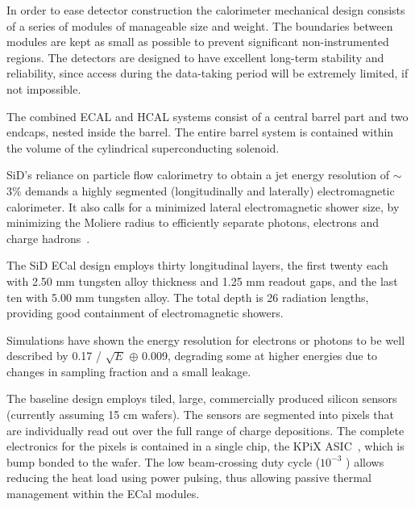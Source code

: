 In order to ease detector construction the calorimeter mechanical design consists of a series of modules of
manageable size and weight. The boundaries between
modules are kept as small as possible to prevent significant non-instrumented
regions. The detectors are designed to have excellent long-term stability and reliability,
since access during the data-taking period will be extremely limited, if not
impossible.

The combined ECAL and HCAL systems consist of a
central barrel part and two endcaps, nested inside the barrel. The entire barrel system is contained
within the volume of the cylindrical superconducting solenoid. 


SiD's reliance on particle flow calorimetry to obtain a jet energy resolution of  $\sim$3\% demands a highly segmented (longitudinally and laterally) electromagnetic calorimeter. It also calls for a minimized lateral electromagnetic shower size, by minimizing the Moliere radius to efficiently separate photons, electrons and charge hadrons~\cite{calor:2018}.

The SiD ECal design employs thirty longitudinal layers, the first twenty each with 2.50 mm tungsten alloy thickness and 1.25 mm readout gaps, and the last ten with 5.00 mm tungsten alloy.  The total depth is 26 radiation lengths, providing good containment of electromagnetic showers.

Simulations have shown the energy resolution for electrons or photons to be well described by 0.17 / $\sqrt{E}$ $\oplus$ 0.009, degrading some at higher energies due to changes in sampling fraction and a small leakage.

The baseline design employs tiled, large, commercially produced silicon sensors (currently assuming 15 cm wafers). The sensors are segmented into pixels that are individually read out over the full range of charge depositions. The complete electronics for the pixels is contained in a single chip, the KPiX ASIC~\cite{Brau:2013yb}, which is bump bonded to the wafer. The low beam-crossing duty cycle ($10^{-3}$ ) allows reducing the heat load using power pulsing, thus allowing passive thermal management within the ECal modules.

